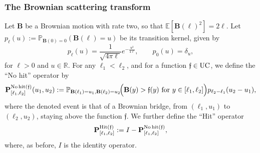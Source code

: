 \documentclass[oneside,final,11pt]{amsart}
\theoremstyle{definition}
\newcommand\hit{\uptext{Hit}}
\newcommand\nohit{\uptext{No\! hit}}
\newcommand{\ff}{\mathfrak{f}}
\newcommand{\R}{\mathbb{R}}
\newcommand{\1}[1]{\mathbf{1}_{#1}}
\newcommand{\E}{\mathbb E}
\newcommand{\uptext}[1]{\text{\upshape{#1}}}
\DeclareMathOperator{\UC}{\uptext{UC}}
\newcommand{\fB}{\mathbf{B}}
\newcommand{\fP}{\mathbf{P}}
\renewcommand{\P}{\mathbb P}
\numberwithin{equation}{section}
\begin{document}
\subsubsection{The Brownian scattering transform}

Let $\fB$ be a Brownian motion with rate two, so that $\E [\fB(\ell)^2] = 2 \ell$. Let $p_\ell(u) := \P_{\fB(0)=0} (\fB(\ell)=u)$ be its transition kernel, given by
\begin{equation}\label{eq:heat_kernel}
p_\ell(u) = \frac{1}{\sqrt{4 \pi \ell}} e^{- \frac{u^2}{4 \ell}}, \qquad p_0(u) = \delta_u,
\end{equation}
for $\ell > 0$ and $u \in \R$. For any $\ell_1 < \ell_2$, and for a function $\ff \in \UC$, we define the ``No hit'' operator by
 \begin{equation}\label{eq:no_hit}
\fP_{[\ell_1,\ell_2]}^{\nohit(\ff)}(u_1,u_2) := \P_{\fB(\ell_1)=u_1, \fB(\ell_2) = u_2}\!\Big(\fB(y)>\ff(y)\text{ for } y \in [\ell_1,\ell_2] \Big) p_{\ell_2 - \ell_1}(u_2 - u_1),
\end{equation}
where the denoted event is that of a Brownian bridge, from $(\ell_1, u_1)$ to $(\ell_2, u_2)$, staying above the function $\ff$. We further define the ``Hit'' operator
\begin{equation}\label{eq:hit_def}
\fP_{[\ell_1,\ell_2]}^{\hit(\ff)} := I- \fP_{[\ell_1,\ell_2]}^{\nohit(\ff)},
\end{equation}
where, as before, $I$ is the identity operator.
\end{document}
